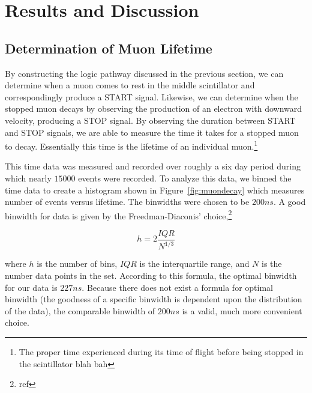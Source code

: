 
\section{Results and Discussion}

\subsection{Determination of Muon Lifetime}

By constructing the logic pathway discussed in the previous section,
we can determine when a muon comes to rest in the middle scintillator
and correspondingly produce a START signal. Likewise, we can determine when the stopped muon decays by observing
the production of an electron with downward velocity, producing a STOP signal.  By observing the
duration between START and STOP signals, we are able to measure
the time it takes for a stopped muon to decay.  Essentially this time
is the lifetime of an individual muon.\footnote{The proper time
experienced during its time of flight before being stopped in the
scintillator blah bah}

This time data was measured and recorded over roughly a six day period
during which nearly $15000$ events were recorded.  To analyze this
data, we binned the time data to create a histogram shown in Figure~\ref{fig:muondecay} which measures number of events versus lifetime.
The binwidths were chosen to be $200 ns$. A good binwidth for data is given by the Freedman-Diaconis' choice,\footnote{ref}

\begin{equation}
\label{eq:binwidth}
h=2\frac{IQR}{N^{1/3}}
\end{equation}

where $h$ is the number of bins, $IQR$ is the interquartile range, and $N$ is the number data points in the set.  According to this formula, the optimal binwidth for our data is $227 ns$.  Because there does not exist a formula for optimal binwidth (the goodness of a specific binwidth is dependent upon the distribution of the data), the comparable binwidth of $200 ns$ is a valid, much more convenient choice. 



